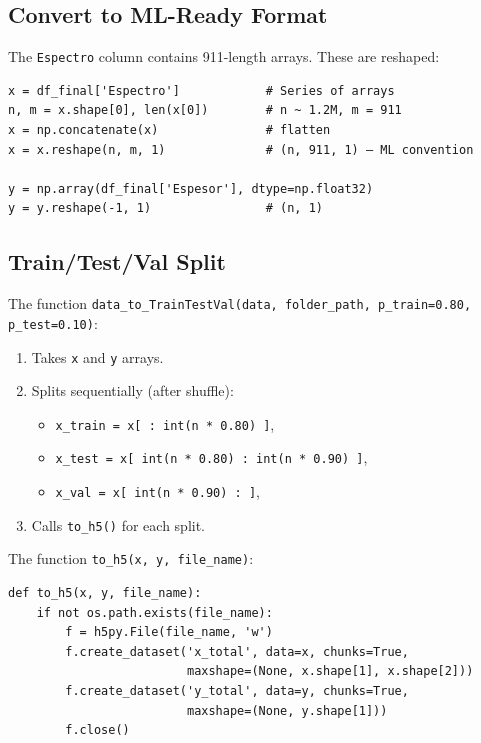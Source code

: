 \documentclass[11pt,a4paper]{article}
\begin{document}
\subsection{Convert to ML-Ready Format}

The {\tt Espectro} column contains 911-length arrays. These are reshaped:

\begin{lstlisting}
x = df_final['Espectro']            # Series of arrays
n, m = x.shape[0], len(x[0])        # n ~ 1.2M, m = 911
x = np.concatenate(x)               # flatten
x = x.reshape(n, m, 1)              # (n, 911, 1) — ML convention

y = np.array(df_final['Espesor'], dtype=np.float32)
y = y.reshape(-1, 1)                # (n, 1)
\end{lstlisting}

\subsection{Train/Test/Val Split}

The function {\tt data\_to\_TrainTestVal(data, folder\_path, p\_train=0.80, p\_test=0.10)}:

\begin{enumerate}
    \item Takes {\tt x} and {\tt y} arrays.
    \item Splits sequentially (after shuffle):
    \begin{itemize}
        \item {\tt x\_train = x[ : int(n * 0.80) ]}, 
        \item {\tt x\_test = x[ int(n * 0.80) : int(n * 0.90) ]}, 
        \item {\tt x\_val = x[ int(n * 0.90) : ]}, 
    \end{itemize}
    \item Calls {\tt to\_h5()} for each split.
\end{enumerate}

The function {\tt to\_h5(x, y, file\_name)}:
\begin{lstlisting}
def to_h5(x, y, file_name):
    if not os.path.exists(file_name):
        f = h5py.File(file_name, 'w')
        f.create_dataset('x_total', data=x, chunks=True,
                         maxshape=(None, x.shape[1], x.shape[2]))
        f.create_dataset('y_total', data=y, chunks=True,
                         maxshape=(None, y.shape[1]))
        f.close()
\end{lstlisting}
\end{document}
